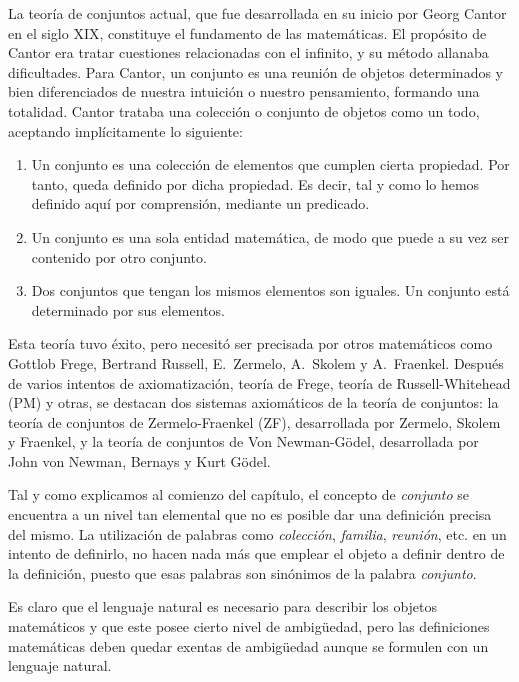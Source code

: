



La teoría de conjuntos actual, que fue desarrollada en su inicio por Georg
Cantor en el siglo XIX, constituye el fundamento de las matemáticas. El
propósito de Cantor era tratar cuestiones relacionadas con el infinito, y su
método allanaba dificultades. Para Cantor, un conjunto es una reunión de
objetos determinados y bien diferenciados de nuestra intuición o nuestro
pensamiento, formando una totalidad. Cantor trataba una colección o conjunto
de objetos como un todo, aceptando implícitamente lo siguiente:

\begin{enumerate}
  \item Un conjunto es una colección de elementos que cumplen cierta
    propiedad. Por tanto, queda definido por dicha propiedad. Es decir, tal
    y como lo hemos definido aquí por comprensión, mediante un predicado.
  \item Un conjunto es una sola entidad matemática, de modo que puede a su
    vez ser contenido por otro conjunto.
  \item Dos conjuntos que tengan los mismos elementos son iguales. Un
    conjunto está determinado por sus elementos.
\end{enumerate}

Esta teoría tuvo éxito, pero necesitó ser precisada por otros matemáticos
como Gottlob Frege, Bertrand Russell, E.~Zermelo, A.~Skolem y A.~Fraenkel.
Después de varios intentos de axiomatización, teoría de Frege, teoría de
Russell-Whitehead (PM) y otras, se destacan dos sistemas axiomáticos de la
teoría de conjuntos: la teoría de conjuntos de Zermelo-Fraenkel (ZF),
desarrollada por Zermelo, Skolem y Fraenkel, y la teoría de conjuntos de Von
Newman-Gödel, desarrollada por John von Newman, Bernays y Kurt Gödel.

Tal y como explicamos al comienzo del capítulo, el concepto de
\emph{conjunto} se encuentra a un nivel tan elemental que no es posible dar
una definición precisa del mismo. La utilización de palabras como
\emph{colección}, \emph{familia}, \emph{reunión}, etc. en un intento de
definirlo, no hacen nada más que emplear el objeto a definir dentro de la
definición, puesto que esas palabras son sinónimos de la palabra
\emph{conjunto}.

Es claro que el lenguaje natural es necesario para describir los objetos
matemáticos y que este posee cierto nivel de ambigüedad, pero las
definiciones matemáticas deben quedar exentas de ambigüedad aunque se
formulen con un lenguaje natural.

